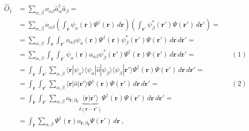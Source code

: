 \documentclass[letterpaper,10pt,english]{jupyterBook}
\begin{document}
\sphinxAtStartPar
{} 
\begin{equation*}
\begin{split}\begin{aligned}
\hat{O}_1
& = \sum_{\alpha, \beta} o_{\alpha \beta} \hat{a}_{\alpha}^{\dagger} \hat{a}_{\beta} = \\
& = \sum_{\alpha, \beta} o_{\alpha \beta} \left( \int_{\mathbf{r}} \psi_a(\mathbf{r}) \Psi^\dagger(\mathbf{r}) \, d \mathbf{r} \right) \left( \int_{\mathbf{r}'} \psi_\beta^*(\mathbf{r}') \Psi(\mathbf{r}') \, d \mathbf{r}' \right) = \\
& = \sum_{\alpha, \beta}  \int_{\mathbf{r}} \int_{\mathbf{r}'} o_{\alpha \beta}  \psi_a(\mathbf{r}) \Psi^\dagger(\mathbf{r})  \psi_\beta^*(\mathbf{r}') \Psi(\mathbf{r}') \, d \mathbf{r} \, d \mathbf{r}' = \\
& = \sum_{\alpha, \beta}  \int_{\mathbf{r}} \int_{\mathbf{r}'}  \psi_a(\mathbf{r}) o_{\alpha \beta} \psi_\beta^*(\mathbf{r}')  \Psi^\dagger(\mathbf{r}) \Psi(\mathbf{r}') \, d \mathbf{r} \, d \mathbf{r}' = && (1) \\
& = \int_{\mathbf{r}} \int_{\mathbf{r}'} \sum_{\alpha, \beta}  \langle \mathbf{r} | \psi_a \rangle \langle \psi_a | \hat{o} | \psi_\beta \rangle \langle \psi_\beta | \mathbf{r}' \rangle  \Psi^\dagger(\mathbf{r}) \Psi(\mathbf{r}') \, d \mathbf{r} \, d \mathbf{r}' = \\
& = \int_{\mathbf{r}} \int_{\mathbf{r}'} \sum_{\alpha, \beta}  \langle \mathbf{r} | \hat{o} | \mathbf{r}' \rangle  \Psi^\dagger(\mathbf{r}) \Psi(\mathbf{r}') \, d \mathbf{r} \, d \mathbf{r}' = && (2) \\
& = \int_{\mathbf{r}} \int_{\mathbf{r}'} \sum_{\alpha, \beta}  o_{\mathbf{r}; \partial_{\mathbf{r}}}  \underbrace{\langle \mathbf{r} | \mathbf{r}' \rangle}_{\delta(\mathbf{r}-\mathbf{r}')}  \Psi^\dagger(\mathbf{r}) \Psi(\mathbf{r}') \, d \mathbf{r} \, d \mathbf{r}' = \\
& = \int_{\mathbf{r}} \sum_{\alpha, \beta}  \Psi^\dagger(\mathbf{r}) o_{\mathbf{r}; \partial_{\mathbf{r}}}  \Psi(\mathbf{r}') \, d \mathbf{r} \ ,
\end{aligned}\end{split}
\end{equation*}\label{ch/quantum-mechanics/many-body/operators:example-0}
\end{document}

